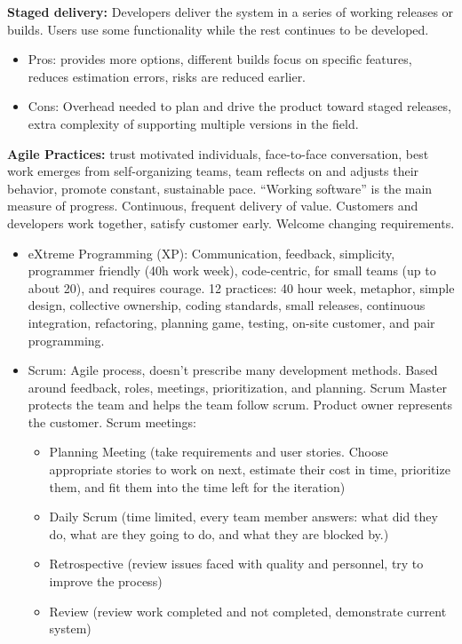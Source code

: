 \documentclass[8pt, letterpaper, titlepage]{article}
\begin{document}
\begin{multicols*}{2}
\textbf{Staged delivery:} Developers deliver the system  in a series of working releases or builds. Users use some functionality while the rest continues to be developed. 
\begin{itemize}
    \item Pros: provides more options, different builds focus on specific features, reduces estimation errors, risks are reduced earlier.
    \item Cons: Overhead needed to plan and drive the product toward staged releases, extra complexity of supporting multiple versions in the field.
\end{itemize}

\textbf{Agile Practices:} trust motivated individuals, face-to-face conversation, best work emerges from self-organizing teams, team reflects on and adjusts their behavior, promote constant, sustainable pace. ``Working software'' is the main measure of progress. Continuous, frequent delivery of value. Customers and developers work together, satisfy customer early. Welcome changing requirements.
\begin{itemize}
    \item eXtreme Programming (XP): Communication, feedback, simplicity, programmer friendly (40h work week), code-centric, for small teams (up to about 20), and requires courage. 12 practices: 40 hour week, metaphor, simple design, collective ownership, coding standards, small releases, continuous integration, refactoring, planning game, testing, on-site customer, and pair programming.
    \item Scrum: Agile process, doesn't prescribe many development methods. Based around feedback, roles, meetings, prioritization, and planning. Scrum Master protects the team and helps the team follow scrum. Product owner represents the customer. Scrum meetings:
    \begin{itemize}
        \item Planning Meeting (take requirements and user stories. Choose appropriate stories to work on next, estimate their cost in time, prioritize them, and fit them into the time left for the iteration)
        \item Daily Scrum (time limited, every team member answers: what did they do, what are they going to do, and what they are blocked by.)
        \item Retrospective (review issues faced with quality and personnel, try to improve the process)
        \item Review (review work completed and not completed, demonstrate current system)
    \end{itemize}
\end{itemize}


\end{multicols*}
\end{document}
